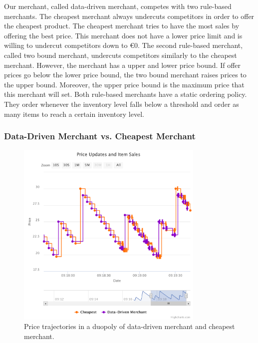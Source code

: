 Our merchant, called data-driven merchant, competes with two rule-based merchants.
The cheapest merchant always undercuts competitors in order to offer the cheapest product.
The cheapest merchant tries to have the most sales by offering the best price.
This merchant does not have a lower price limit and is willing to undercut competitors down to €0.
The second rule-based merchant, called two bound merchant, undercuts competitors similarly to the cheapest merchant.
However, the merchant has a upper and lower price bound.
If offer prices go below the lower price bound, the two bound merchant raises prices to the upper bound.
Moreover, the upper price bound is the maximum price that this merchant will set.
Both rule-based merchants have a static ordering policy.
They order whenever the inventory level falls below a threshold and order as many items to reach a certain inventory level.

\subsubsection{Data-Driven Merchant vs. Cheapest Merchant}

\begin{figure}[t]
	\centering
	\includegraphics[width=0.8\textwidth]{figures/duopoly_cheapest_prices}
	\caption[Price trajectories: data-driven merchant versus cheapest merchant]{Price trajectories in a duopoly of data-driven merchant and cheapest merchant.}
	\label{fig:duopoly_cheapest}
\end{figure}

